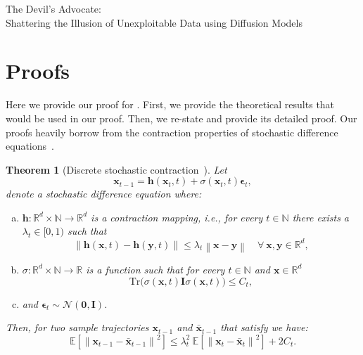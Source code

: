 \documentclass[conference]{IEEEtran}
\newtheorem{theorem}{Theorem}
\theoremstyle{definition}
\theoremstyle{remark}
\theoremstyle{proposition}
\newcommand{\norm}[1]{\left\lVert#1\right\rVert}
\begin{document}



\clearpage
\newpage
\onecolumn
\appendices
\begin{center}
\Large{The Devil's Advocate:\\Shattering the Illusion of Unexploitable Data using Diffusion Models}
\end{center}
\section{Proofs}\label{sec:proofs}
Here we provide our proof for .
First, we provide the theoretical results that would be used in our proof.
Then, we re-state  and provide its detailed proof.
Our proofs heavily borrow from the contraction properties of stochastic difference equations~\citep{pham2008analysis, pham2009concentration, chung2022come}.

\begin{theorem}[Discrete stochastic contraction~\citep{pham2008analysis, chung2022come}]\label{thm:contraction}
    Let
    \begin{equation}\label{eq:sde}
        \boldsymbol{x}_{t-1}=\mathbf{h}(\boldsymbol{x}_t, t)+\sigma(\boldsymbol{x}_t, t) \boldsymbol{\epsilon}_t,
    \end{equation}
    denote a stochastic difference equation where:
    \begin{enumerate}[(a)]\setlength\itemsep{-0.5pt}
        \item $\mathbf{h}: \mathbb{R}^{d} \times \mathbb{N} \rightarrow \mathbb{R}^{d}$ is a contraction mapping, i.e., for every $t \in \mathbb{N}$ there exists a $\lambda_{t} \in [0, 1)$ such that
        \begin{equation}\label{eq:contraction}
            \norm{\mathbf{h}(\boldsymbol{x}, t) - \mathbf{h}(\boldsymbol{y}, t)} \leq \lambda_{t} \norm{\boldsymbol{x} - \boldsymbol{y}} \quad \forall~\boldsymbol{x}, \boldsymbol{y} \in \mathbb{R}^{d},
        \end{equation}
        \item $\sigma: \mathbb{R}^{d} \times \mathbb{N} \rightarrow \mathbb{R}$ is a function such that for every $t \in \mathbb{N}$ and $\boldsymbol{x} \in \mathbb{R}^{d}$
        \begin{equation}\label{eq:trace}
            \mathrm{Tr}\big(\sigma(\boldsymbol{x}, t)\mathbf{I}\sigma(\boldsymbol{x}, t)\big) \leq C_{t},
        \end{equation}
        \item and $\boldsymbol{\epsilon}_t \sim \mathcal{N}(\mathbf{0}, \mathbf{I})$.
    \end{enumerate}
    Then, for two sample trajectories $\boldsymbol{x}_{t-1}$ and $\bar{\boldsymbol{x}}_{t-1}$ that satisfy  we have:
    \begin{equation}\label{eq:sde_contraction}
        \mathbb{E}\left[\norm{\boldsymbol{x}_{t-1}-\bar{\boldsymbol{x}}_{t-1}}^2\right] \leq \lambda_{t}^{2}~\mathbb{E}\left[\norm{\boldsymbol{x}_{t}-\bar{\boldsymbol{x}}_{t}}^2\right] + 2 C_{t}.
    \end{equation}
\end{theorem}
\end{document}
